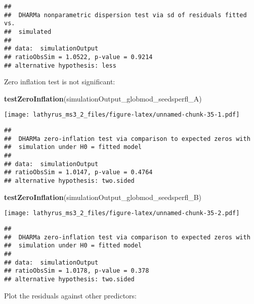 \documentclass[
]{article}
\newenvironment{Shaded}{\begin{snugshade}}{\end{snugshade}}
\newcommand{\DataTypeTok}[1]{\textcolor[rgb]{0.13,0.29,0.53}{#1}}
\newcommand{\DecValTok}[1]{\textcolor[rgb]{0.00,0.00,0.81}{#1}}
\newcommand{\KeywordTok}[1]{\textcolor[rgb]{0.13,0.29,0.53}{\textbf{#1}}}
\newcommand{\NormalTok}[1]{#1}
\newcommand{\OperatorTok}[1]{\textcolor[rgb]{0.81,0.36,0.00}{\textbf{#1}}}
\begin{document}
\begin{verbatim}
## 
##  DHARMa nonparametric dispersion test via sd of residuals fitted vs.
##  simulated
## 
## data:  simulationOutput
## ratioObsSim = 1.0522, p-value = 0.9214
## alternative hypothesis: less
\end{verbatim}

Zero inflation test is not significant:

\begin{Shaded}
\begin{Highlighting}[]
\KeywordTok{testZeroInflation}\NormalTok{(simulationOutput_globmod_seedsperfl_A)}
\end{Highlighting}
\end{Shaded}

\texttt{[image: lathyrus\_ms3\_2\_files/figure-latex/unnamed-chunk-35-1.pdf]}

\begin{verbatim}
## 
##  DHARMa zero-inflation test via comparison to expected zeros with
##  simulation under H0 = fitted model
## 
## data:  simulationOutput
## ratioObsSim = 1.0147, p-value = 0.4764
## alternative hypothesis: two.sided
\end{verbatim}

\begin{Shaded}
\begin{Highlighting}[]
\KeywordTok{testZeroInflation}\NormalTok{(simulationOutput_globmod_seedsperfl_B)}
\end{Highlighting}
\end{Shaded}

\texttt{[image: lathyrus\_ms3\_2\_files/figure-latex/unnamed-chunk-35-2.pdf]}

\begin{verbatim}
## 
##  DHARMa zero-inflation test via comparison to expected zeros with
##  simulation under H0 = fitted model
## 
## data:  simulationOutput
## ratioObsSim = 1.0178, p-value = 0.378
## alternative hypothesis: two.sided
\end{verbatim}

Plot the residuals against other predictors:

\begin{Shaded}
\end{Shaded}
\end{document}

